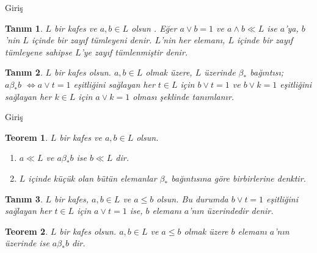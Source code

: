 \documentclass[mathserif]{beamer}
\newtheorem*{teorem}{Teorem}
\newtheorem*{tanim}{Tanım}
\begin{document}
\begin{frame}{Giriş}
\begin{tanim}
  $ L $ bir kafes ve $ a,b \in L $ olsun . Eğer $a \vee b =1 $ ve $ a \wedge b \ll L $ ise $ a $'ya, $ b $'nin $ L $ içinde bir
      \textit{zayıf tümleyeni} denir. $L$'nin her elemanı, $L$ içinde bir zayıf tümleyene sahipse $L$'ye \textit{zayıf tümlenmiştir} denir.
\end{tanim}

\begin{tanim} 
$ L $ bir kafes olsun. $ a,b \in L $ olmak üzere, $ L $ üzerinde $ \beta_* $ bağıntısı;
\\ $ a \beta_* b $
$ \Leftrightarrow a \vee t = 1 $ eşitliğini sağlayan her $ t \in L $ için $ b \vee t = 1 $ ve 
$ b \vee k = 1 $ eşitliğini sağlayan her $ k \in L $ için $ a \vee k = 1 $ olması şeklinde tanımlanır.
\end{tanim}
\end{frame}

\begin{frame}{Giriş}
\begin{teorem} 
    $ L $ bir kafes ve $ a,b \in L $ olsun.
    \begin{enumerate}
        \item $ a \ll L $ ve $ a \beta_* b $ ise $ b \ll L $ dir.
        \item $ L $ içinde küçük olan bütün elemanlar $ \beta_* $ bağıntısına göre birbirlerine denktir.
    \end{enumerate}
\end{teorem}

\begin{tanim}
    $ L $ bir kafes, $ a, b \in L $ ve $ a \leq b $ olsun. Bu durumda $ b \vee t = 1 $ eşitliğini sağlayan her $ t \in L $ için 
    $ a \vee t = 1 $ ise, \textit{$ b $ elemanı $ a $'nın üzerindedir} denir.
\end{tanim}

\begin{teorem}
    $ L $ bir kafes olsun. $ a,b \in L $ ve $ a \leq b $ olmak üzere $ b $ elemanı $ a $'nın üzerinde ise $ a \beta_* b $ dir.
\end{teorem}
\end{frame}
\end{document}
